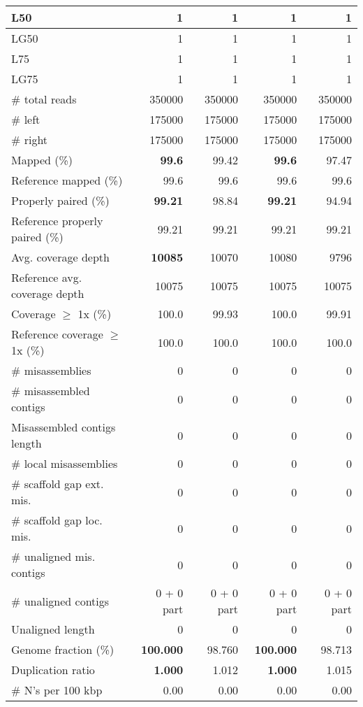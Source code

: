 \documentclass[12pt,a4paper]{article}
\begin{document}
\begin{table}[ht]
\begin{center}
\begin{tabular}{|l*{4}{|r}|}
L50 & 1 & 1 & 1 & 1 \\ \hline
LG50 & 1 & 1 & 1 & 1 \\ \hline
L75 & 1 & 1 & 1 & 1 \\ \hline
LG75 & 1 & 1 & 1 & 1 \\ \hline
\# total reads & 350000 & 350000 & 350000 & 350000 \\ \hline
\# left & 175000 & 175000 & 175000 & 175000 \\ \hline
\# right & 175000 & 175000 & 175000 & 175000 \\ \hline
Mapped (\%) & {\bf 99.6} & 99.42 & {\bf 99.6} & 97.47 \\ \hline
Reference mapped (\%) & 99.6 & 99.6 & 99.6 & 99.6 \\ \hline
Properly paired (\%) & {\bf 99.21} & 98.84 & {\bf 99.21} & 94.94 \\ \hline
Reference properly paired (\%) & 99.21 & 99.21 & 99.21 & 99.21 \\ \hline
Avg. coverage depth & {\bf 10085} & 10070 & 10080 & 9796 \\ \hline
Reference avg. coverage depth & 10075 & 10075 & 10075 & 10075 \\ \hline
Coverage $\geq$ 1x (\%) & 100.0 & 99.93 & 100.0 & 99.91 \\ \hline
Reference coverage $\geq$ 1x (\%) & 100.0 & 100.0 & 100.0 & 100.0 \\ \hline
\# misassemblies & 0 & 0 & 0 & 0 \\ \hline
\# misassembled contigs & 0 & 0 & 0 & 0 \\ \hline
Misassembled contigs length & 0 & 0 & 0 & 0 \\ \hline
\# local misassemblies & 0 & 0 & 0 & 0 \\ \hline
\# scaffold gap ext. mis. & 0 & 0 & 0 & 0 \\ \hline
\# scaffold gap loc. mis. & 0 & 0 & 0 & 0 \\ \hline
\# unaligned mis. contigs & 0 & 0 & 0 & 0 \\ \hline
\# unaligned contigs & 0 + 0 part & 0 + 0 part & 0 + 0 part & 0 + 0 part \\ \hline
Unaligned length & 0 & 0 & 0 & 0 \\ \hline
Genome fraction (\%) & {\bf 100.000} & 98.760 & {\bf 100.000} & 98.713 \\ \hline
Duplication ratio & {\bf 1.000} & 1.012 & {\bf 1.000} & 1.015 \\ \hline
\# N's per 100 kbp & 0.00 & 0.00 & 0.00 & 0.00 \\ \hline

\end{tabular}
\end{center}
\end{table}
\end{document}
